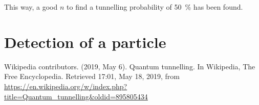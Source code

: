 \documentclass[a4paper,12pt,twoside]{article}
\begin{document}
      This way, a good $n$ to find a tunnelling probability of \SI{50}{\percent} has been found.


\newpage
\section{Detection of a particle}





  \newpage
  \begin{thebibliography}{99}
     Wikipedia contributors. (2019, May 6). Quantum tunnelling. In Wikipedia, The Free Encyclopedia. Retrieved 17:01, May 18, 2019, from \url{https://en.wikipedia.org/w/index.php?title=Quantum_tunnelling&oldid=895805434}


  \end{thebibliography}
\end{document}
